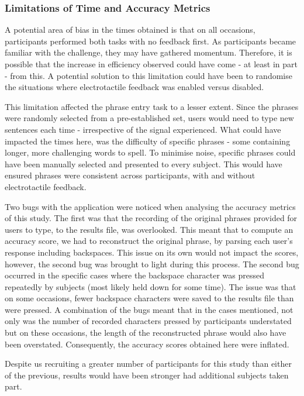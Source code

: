 \documentclass{mpaper}
\begin{document}
\subsubsection{Limitations of Time and Accuracy Metrics}
A potential area of bias in the times obtained is that on all occasions, participants performed both tasks with no feedback first. As participants became familiar with the challenge, they may have gathered momentum. Therefore, it is possible that the increase in efficiency observed could have come - at least in part - from this. A potential solution to this limitation could have been to randomise the situations where electrotactile feedback was enabled versus disabled.

This limitation affected the phrase entry task to a lesser extent. Since the phrases were randomly selected from a pre-established set, users would need to type new sentences each time - irrespective of the signal experienced. What could have impacted the times here, was the difficulty of specific phrases - some containing longer, more challenging words to spell. To minimise noise, specific phrases could have been manually selected and presented to every subject. This would have ensured phrases were consistent across participants, with and without electrotactile feedback.

Two bugs with the application were noticed when analysing the accuracy metrics of this study. The first was that the recording of the original phrases provided for users to type, to the results file, was overlooked. This meant that to compute an accuracy score, we had to reconstruct the original phrase, by parsing each user's response including backspaces. This issue on its own would not impact the scores, however, the second bug was brought to light during this process. The second bug occurred in the specific cases where the backspace character was pressed repeatedly by subjects (most likely held down for some time). The issue was that on some occasions, fewer backspace characters were saved to the results file than were pressed. A combination of the bugs meant that in the cases mentioned, not only was the number of recorded characters pressed by participants understated but on these occasions, the length of the reconstructed phrase would also have been overstated. Consequently, the accuracy scores obtained here were inflated.

Despite us recruiting a greater number of participants for this study than either of the previous, results would have been stronger had additional subjects taken part. 
\end{document}
